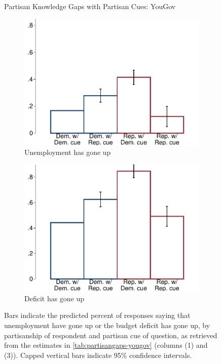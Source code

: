 \documentclass[12pt, letterpaper]{article}
\begin{document}
\begin{figure}[ht]
	\caption{Partisan Knowledge Gaps with Partisan Cues: YouGov}	
	\centering
	\begin{subfigure}{.495\textwidth}\centering
		\includegraphics[width=\textwidth]{../figs/yougov-unemp.pdf}
		\caption{Unemployment has gone up}
	\end{subfigure}
	\hfil
	\begin{subfigure}{.495\textwidth}\centering
		\includegraphics[width=\textwidth]{../figs/yougov-deficit.pdf}
		\caption{Deficit has gone up}
	\end{subfigure}	
	\caption*{\footnotesize Bars indicate the predicted percent of responses saying that unemployment have gone up or the budget deficit has gone up, by partisanship of respondent and partisan cue of question, as retrieved from the estimates in \cref{tab:partisangaps-yougov} (columns (1) and (3)).  
	Capped vertical bars indicate 95\% confidence intervals.
	}
	\label{fig:yougov-reg-results}
\end{figure}
\end{document}
